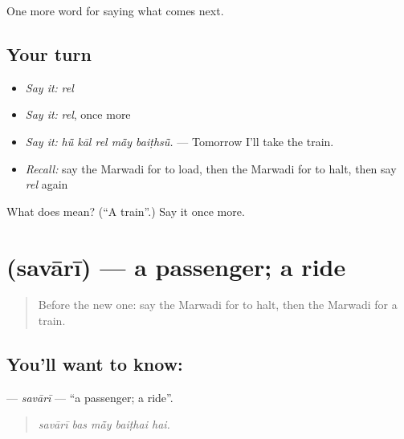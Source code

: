 \begin{grammarlens}[title={What you've built}]
One more word for saying what comes next.
\end{grammarlens}

\subsection*{Your turn}
\begin{itemize}
\raggedright
  \item \emph{Say it:} \emph{rel}
  \item \emph{Say it:} \emph{rel}, once more
  \item \emph{Say it:} \emph{hū̃ kāl rel mā̃y baiṭhsū̃.} — Tomorrow I'll take the train.
  \item \emph{Recall:} say the Marwadi for to load, then the Marwadi for to halt, then say \emph{rel} again
\end{itemize}

\begin{tcolorbox}[breakable,colback=teal!4,colframe=teal!35!black,title={Before you move on}]
What does  mean? (\textquotedblleft{}A train\textquotedblright{}.) Say it once more.
\end{tcolorbox}
\section[\texorpdfstring{\mw{सवारी} (savārī)}{सवारी (savārī)}]{ (savārī) — a passenger; a ride}

\label{lesson:MW-C218-savari}



\begin{quote}
Before the new one: say the Marwadi for to halt, then the Marwadi for a train.
\end{quote}

\subsection*{You'll want to know: }
\textbf{} — \emph{savārī} — \textquotedblleft{}a passenger; a ride\textquotedblright{}.

\begin{quote}
    
\end{quote}

\begin{quote}
\emph{savārī bas mā̃y baiṭhai hai.}
\end{quote}

